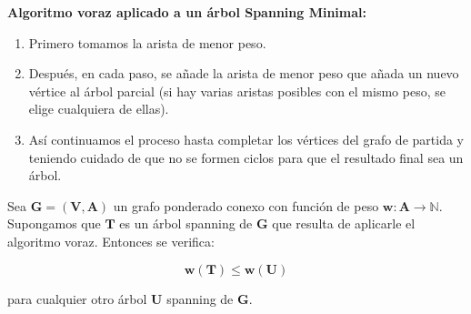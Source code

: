 \documentclass[twoside]{report}
\newcommand{\bs}[1]{\boldsymbol{#1}}
\begin{document}
\noindent\textbf{Algoritmo voraz aplicado a un árbol Spanning Minimal:}
\vspace{0.3cm}

        \begin{enumerate}
            \item Primero tomamos la arista de menor peso.
            \item Después, en cada paso, se añade la arista de menor peso que añada un nuevo vértice al árbol parcial
            (si hay varias aristas posibles con el mismo peso, se elige cualquiera de ellas).
            \item Así con\-ti\-nua\-mos el proceso hasta completar los vértices del grafo de partida y teniendo cuidado de que no se formen ciclos
            para que el resultado final sea un árbol.
        \end{enumerate}

\vspace{0.2cm}

%
%

\begin{teorema}
Sea $\bs{G=(V,A)}$ un grafo ponderado conexo con función de peso $\bs{w:A\rightarrow\mathbb{N}}$. Supongamos que $\bs{T}$ es un árbol
spanning de $\bs{G}$ que resulta de aplicarle el algoritmo voraz. Entonces se verifica:

        $$\bs{w(T)\leq w(U)}$$

para cualquier otro árbol $\bs{U}$ spanning de $\bs{G}$.
\end{teorema}
\end{document}
